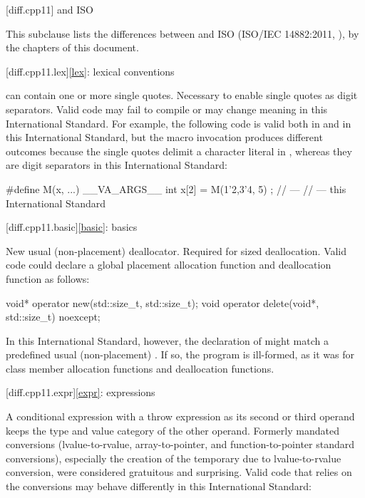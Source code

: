 [diff.cpp11]{\Cpp{} and ISO \CppXI{}}

\pnum
{}%
This subclause lists the differences between \Cpp{} and
ISO \CppXI{} (ISO/IEC 14882:2011, ),
by the chapters of this document.

[diff.cpp11.lex]{\ref{lex}: lexical conventions}

\change
{} can contain one or more single quotes.
\rationale
Necessary to enable single quotes as digit separators.
\effect
Valid \CppXI{} code may fail to compile or may change meaning in this
International Standard. For example, the following code is valid both in \CppXI{} and in
this International Standard, but the macro invocation produces different outcomes
because the single quotes delimit a character literal in \CppXI{}, whereas they are digit
separators in this International Standard:

\begin{codeblock}
#define M(x, ...) __VA_ARGS__
int x[2] = { M(1'2,3'4, 5) };
//  --- \CppXI{}
//  --- this International Standard
\end{codeblock}

[diff.cpp11.basic]{\ref{basic}: basics}

\change
New usual (non-placement) deallocator.
\rationale
Required for sized deallocation.
\effect
Valid \CppXI{} code could declare a global placement allocation function and
deallocation function as follows:
\begin{codeblock}
void* operator new(std::size_t, std::size_t);
void operator delete(void*, std::size_t) noexcept;
\end{codeblock}

In this International Standard, however, the declaration of 
might match a predefined usual (non-placement)
. If so, the
program is ill-formed, as it was for class member allocation functions and
deallocation functions.

[diff.cpp11.expr]{\ref{expr}: expressions}

\change
A conditional expression with a throw expression as its second or third
operand keeps the type and value category of the other operand.
\rationale
Formerly mandated conversions (lvalue-to-rvalue,
array-to-pointer, and function-to-pointer
standard conversions), especially the creation of the temporary due to
lvalue-to-rvalue conversion, were considered gratuitous and surprising.
\effect
Valid \CppXI{} code that relies on the conversions may behave differently
in this International Standard:

